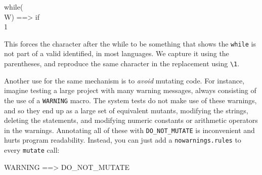 \begin{code}
while(\\W) ==> if\\1 
\end{code}

\noindent This forces the character after the while to be something
that shows the {\tt while} is not part of a valid identified, in most
languages.  We capture it using the parentheses, and reproduce the
same character in the replacement using {\tt \textbackslash1}.

Another use for the same mechanism is to \emph{avoid} mutating code.
For instance, imagine testing a large project with many warning
messages, always consisting of the use of a {\tt WARNING} macro.  The
system tests do not make use of these warnings, and so they end up as
a large set of equivalent mutants, modifying the strings, deleting the
statements, and modifying numeric constants or arithmetic operators in
the warnings.  Annotating all of these with {\tt DO\_NOT\_MUTATE} is
inconvenient and hurts program readability.  Instead, you can just add a
{\tt nowarnings.rules} to every {\tt mutate} call:

\begin{code}
WARNING ==> DO\_NOT\_MUTATE
\end{code}